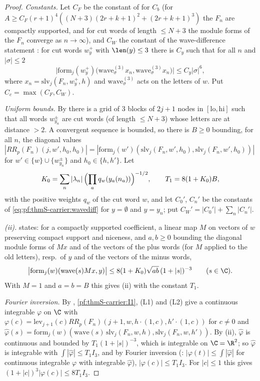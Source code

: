 \begin{proof}
\emph{Constants.} Let $C_F$ be the constant of  for $C_b$ (for
$A\ge C_F(r+1)^4((N+3)(2r+k+1)^2+(2r+k+1)^3)$ the $F_n$ are compactly supported, and for cut words of length $\le N+3$ the
module forms of the $F_n$ converge as $n\to\infty$), and $C_W$ the constant of the wave-difference statement
: for cut words $w^+_y$ with $\len(y)\le3$ there is $C_y$ such that
for all $n$ and $|\sigma|\le2$
\begin{equation}\label{eq:pf:thmS-carrier:wavediff}
\bigl|\mathrm{form}_j(w^+_y)\bigl(\mathrm{wave}^{(3)}_\sigma x_n,\mathrm{wave}^{(3)}_\sigma x_n\bigr)\bigr|\le C_y|\sigma|^6,
\end{equation}
where $x_n=\mathrm{slv}_j(F_n,w^+_y,h)$ and $\mathrm{wave}^{(3)}_\sigma$ acts on the letters of $w$. Put $C_c=\max(C_F,C_W)$.

\emph{Uniform bounds.} By  there is a grid of $3$ blocks of $2j+1$ nodes in
$[\mathrm{lo},\mathrm{hi}]$ such that all words $w^\pm_{y_n}$ are cut words (of length $\le N+3$) whose letters are at distance
$>2$. A convergent sequence is bounded, so there is $B\ge0$ bounding, for all $n$, the diagonal values
$|RR_p(F_n)(j,w',h_0,h_0)|=|\mathrm{form}_j(w')(\mathrm{slv}_j(F_n,w',h_0),\mathrm{slv}_j(F_n,w',h_0))|$ for
$w'\in\{w\}\cup\{w^\pm_{y_n}\}$ and $h_0\in\{h,h'\}$. Let
\[
K_0=\sum_n|\lambda_n|\,\Bigl(\prod_aq_w(y_a(n_a))\Bigr)^{-1/2},\qquad T_1=8(1+K_0)B,
\]
with the positive weights $q_w$ of the cut word $w$, and let $C_0'$, $C_n'$ be the constants of \eqref{eq:pf:thmS-carrier:wavediff}
for $y=\emptyset$ and $y=y_n$; put $C_W'=|C_0'|+\sum_n|C_n'|$.

\emph{(ii).}  states: for a compactly supported coefficient, a linear map
$M$ on vectors of $w$ preserving compact support and niceness, and $a,b\ge0$ bounding the diagonal module forms of $Mx$ and of
the vectors of the plus words (for $M$ applied to the old letters), resp.\ of $y$ and of the vectors of the minus words,
\[
\bigl|\mathrm{form}_j(w)(\mathrm{wave}(s)Mx,y)\bigr|\le8(1+K_0)\sqrt{ab}\,(1+|s|)^{-3}\qquad(s\in\C).
\]
With $M=1$ and $a=b=B$ this gives (ii) with the constant $T_1$.

\emph{Fourier inversion.} By , \ref{pf:thmS-carrier:I1}, (L1) and
(L2) give a continuous integrable $\varphi$ on $\C$ with $\varphi(c)=\mathrm{lev}_{j+1}(c)RR_p(F_n)(j+1,w,h\cdot(1,c),
h'\cdot(1,c))$ for $c\ne0$ and $\hat\varphi(s)=\mathrm{form}_j(w)(\mathrm{wave}(s)\,\mathrm{slv}_j(F_n,w,h),
\mathrm{slv}_j(F_n,w,h'))$. By (ii), $\hat\varphi$ is continuous and bounded by $T_1(1+|s|)^{-3}$, which is integrable on $\C=\R^2$; so $\hat\varphi$ is
integrable with $\int|\hat\varphi|\le T_1I_3$, and by Fourier inversion
(: $|\varphi(t)|\le\int|\hat\varphi|$ for continuous integrable
$\varphi$ with integrable $\hat\varphi$), $|\varphi(c)|\le T_1I_3$. For $|c|\le1$ this gives $(1+|c|)^3|\varphi(c)|\le8T_1I_3$.


\end{proof}
